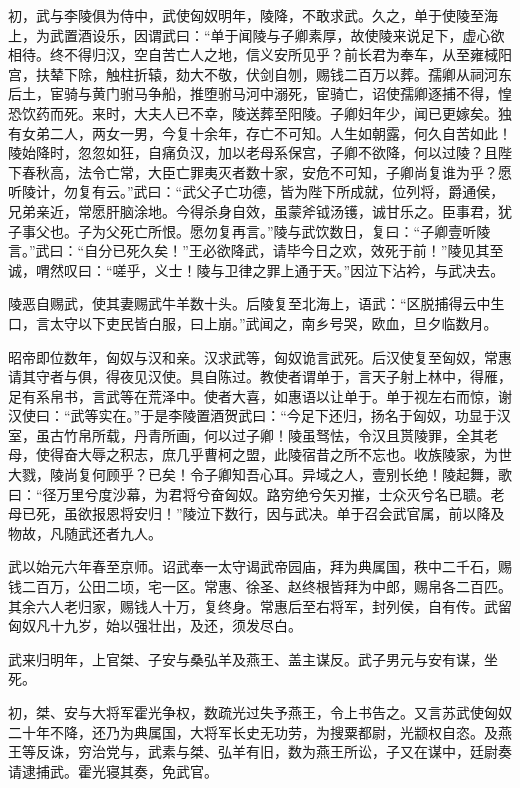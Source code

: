 \documentclass[12pt,UTF8]{ctexbook}
\begin{document}
初，武与李陵俱为侍中，武使匈奴明年，陵降，不敢求武。久之，单于使陵至海上，为武置酒设乐，因谓武曰：“单于闻陵与子卿素厚，故使陵来说足下，虚心欲相待。终不得归汉，空自苦亡人之地，信义安所见乎？前长君为奉车，从至雍棫阳宫，扶辇下除，触柱折辕，劾大不敬，伏剑自刎，赐钱二百万以葬。孺卿从祠河东后土，宦骑与黄门驸马争船，推堕驸马河中溺死，宦骑亡，诏使孺卿逐捕不得，惶恐饮药而死。来时，大夫人已不幸，陵送葬至阳陵。子卿妇年少，闻已更嫁矣。独有女弟二人，两女一男，今复十余年，存亡不可知。人生如朝露，何久自苦如此！陵始降时，忽忽如狂，自痛负汉，加以老母系保宫，子卿不欲降，何以过陵？且陛下春秋高，法令亡常，大臣亡罪夷灭者数十家，安危不可知，子卿尚复谁为乎？愿听陵计，勿复有云。”武曰：“武父子亡功德，皆为陛下所成就，位列将，爵通侯，兄弟亲近，常愿肝脑涂地。今得杀身自效，虽蒙斧钺汤镬，诚甘乐之。臣事君，犹子事父也。子为父死亡所恨。愿勿复再言。”陵与武饮数日，复曰：“子卿壹听陵言。”武曰：“自分已死久矣！”王必欲降武，请毕今日之欢，效死于前！”陵见其至诚，喟然叹曰：“嗟乎，义士！陵与卫律之罪上通于天。”因泣下沾衿，与武决去。



陵恶自赐武，使其妻赐武牛羊数十头。后陵复至北海上，语武：“区脱捕得云中生口，言太守以下吏民皆白服，曰上崩。”武闻之，南乡号哭，欧血，旦夕临数月。



昭帝即位数年，匈奴与汉和亲。汉求武等，匈奴诡言武死。后汉使复至匈奴，常惠请其守者与俱，得夜见汉使。具自陈过。教使者谓单于，言天子射上林中，得雁，足有系帛书，言武等在荒泽中。使者大喜，如惠语以让单于。单于视左右而惊，谢汉使曰：“武等实在。”于是李陵置酒贺武曰：“今足下还归，扬名于匈奴，功显于汉室，虽古竹帛所载，丹青所画，何以过子卿！陵虽驽怯，令汉且贳陵罪，全其老母，使得奋大辱之积志，庶几乎曹柯之盟，此陵宿昔之所不忘也。收族陵家，为世大戮，陵尚复何顾乎？已矣！令子卿知吾心耳。异域之人，壹别长绝！陵起舞，歌曰：“径万里兮度沙幕，为君将兮奋匈奴。路穷绝兮矢刃摧，士众灭兮名已聩。老母已死，虽欲报恩将安归！”陵泣下数行，因与武决。单于召会武官属，前以降及物故，凡随武还者九人。



武以始元六年春至京师。诏武奉一太守谒武帝园庙，拜为典属国，秩中二千石，赐钱二百万，公田二顷，宅一区。常惠、徐圣、赵终根皆拜为中郎，赐帛各二百匹。其余六人老归家，赐钱人十万，复终身。常惠后至右将军，封列侯，自有传。武留匈奴凡十九岁，始以强壮出，及还，须发尽白。



武来归明年，上官桀、子安与桑弘羊及燕王、盖主谋反。武子男元与安有谋，坐死。



初，桀、安与大将军霍光争权，数疏光过失予燕王，令上书告之。又言苏武使匈奴二十年不降，还乃为典属国，大将军长史无功劳，为搜粟都尉，光颛权自恣。及燕王等反诛，穷治党与，武素与桀、弘羊有旧，数为燕王所讼，子又在谋中，廷尉奏请逮捕武。霍光寝其奏，免武官。
\end{document}
